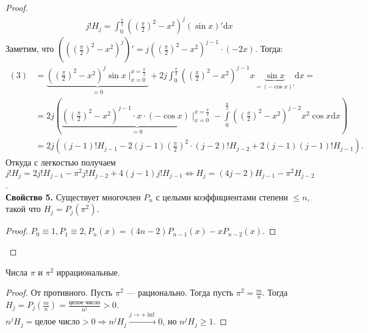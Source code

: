 \begin{proof}
\begin{align}
    j! H_j = \int_0^{\frac{\pi}{2}} \left(\left(\frac{\pi}{2}\right)^2 - x^2\right)^j (\sin x)' \mathrm{d}x
\end{align}
Заметим, что $\left(\left(\left(\frac{\pi}{2}\right)^2 - x^2\right)^j\right)' = j \left(\left(\frac{\pi}{2}\right)^2 - x^2\right)^{j-1} \cdot (-2x)$. Тогда: \begin{align*}
    (3) &= \underbrace{\left(\left( \frac{\pi}{2} \right)^2 - x^2\right)^j \sin x \mid_{x = 0}^{x = \frac{\pi}{2}}}_{=0} + 2j \int_{0}^{\frac{\pi}{2}}\left(\left(\frac{\pi}{2}\right)^2 - x^2\right)^{j-1} x \underbrace{\sin x}_{=(-\cos x)'} \mathrm{d} x = \\
        &= 2j \left(\underbrace{\left(\left(\frac{\pi}{2}\right)^2 - x^2\right)^{j-1} \cdot x \cdot (- \cos x) \mid_{x=0}^{x=\frac{\pi}{2}}}_{=0} - \int\limits_0^{\frac{n}{2}} \left(\left(\frac{\pi}{2}\right)^2 - x^2\right)^{j-2} x^2 \cos x \mathrm{d} x\right) \\
        &= 2j\left((j-1)! H_{j-1} - 2(j-1)\left(\frac{\pi}{2}\right)^2 \cdot (j-2)! H_{j-2} + 2(j-1)(j-1)! H_{j-1}\right)
.\end{align*}
Откуда с легкостью получаем $j! H_j = 2j! H_{j-1} - \pi^2 j! H_{j-2} + 4(j-1)j! H_{j-1} \iff H_j = (4j-2)H_{j-1} - \pi^2 H_{j-2}$.\\
\textbf{Свойство 5.} Существует многочлен $P_n$ с целыми коэффициентами степени $\le n$, такой что $H_j = P_j(\pi^2)$.
\begin{proof}
    $P_0 \equiv 1, P_1 \equiv 2, P_n(x) = (4n-2)P_{n-1}(x) - xP_{n-2}(x)$.
\end{proof}
\end{proof}
\begin{theorem}
    Числа $\pi$ и  $\pi^2$ иррациональные.
\end{theorem}
\begin{proof}
    От противного. Пусть $\pi^2$ --- рационально. Тогда пусть  $\pi^2 = \frac{m}{n}$. Тогда $H_j = P_j(\frac{m}{n}) = \frac{\text{целое число}}{n^j} > 0$.\\
    $n^j H_j = \text{целое число} > 0 \Rightarrow n^j H_j \xrightarrow{j \to +\inf} 0$, но $n^j H_j \ge 1$.
\end{proof}

